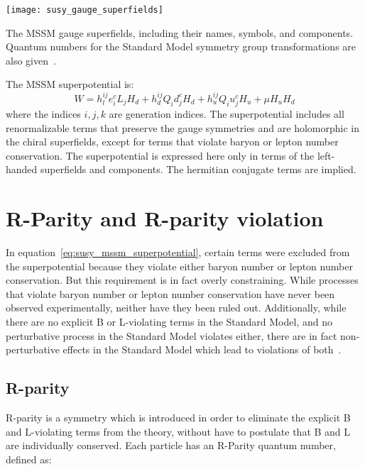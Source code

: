\begin{table}[!ht]
    \centering

  \texttt{[image: susy\_gauge\_superfields]}
    \caption{The MSSM gauge superfields, including their names, symbols, and components.
  Quantum numbers for the Standard Model symmetry group transformations are also given~\cite{susy-primer-1998}.}\label{tbl:susy_gauge_fields}
\end{table}
The MSSM superpotential is:
\begin{equation}\label{eq:susy_mssm_superpotential}
    W = h_l^{ij} e_i^c L_j H_d + h_d^{ij} Q_i d_j^c H_d + h_u^{ij} Q_i u_j^c H_u + \mu H_u H_d
\end{equation}
where the indices $i, j, k$ are generation indices.
The superpotential includes all renormalizable terms that preserve the gauge symmetries and are holomorphic in the chiral superfields, except for terms that violate baryon or lepton number conservation.
The superpotential is expressed here only in terms of the left-handed superfields and components.
The hermitian conjugate terms are implied.

\section{R-Parity and R-parity violation}\label{sec:susy_rpv}

In equation~\ref{eq:susy_mssm_superpotential}, certain terms were excluded from the superpotential because they
violate either baryon number or lepton number conservation.
But this requirement is in fact overly constraining.
While processes that violate baryon number or lepton number conservation have never been observed experimentally,
neither have they been ruled out.
Additionally, while there are no explicit B or L-violating terms in the Standard Model,
and no perturbative process in the Standard Model violates either,
there are in fact non-perturbative effects in the Standard Model which lead to violations of both~\cite{susy-bl-violation}.

\subsection{R-parity}\label{subsec:r_parity}

R-parity is a symmetry which is introduced in order to eliminate the explicit B and L-violating terms from the theory, without have to postulate that B and L are individually conserved.
Each particle has an R-Parity quantum number, defined as:

